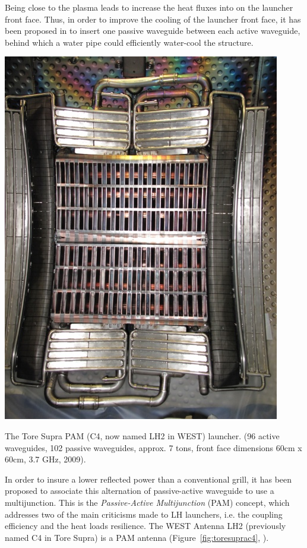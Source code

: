Being close to the plasma leads to increase the heat fluxes into on the launcher front face. Thus, in order to improve the cooling of the launcher front face, it has been proposed in  to insert one passive waveguide between each active waveguide, behind which a water pipe could efficiently water-cool the structure. 

\begin{marginfigure}
	\centering
	\includegraphics[width=0.9\linewidth]{figures/chap3/ToreSupra_C4}
	\caption{The Tore Supra PAM (C4, now named LH2 in WEST) launcher. (96 active waveguides, 102 passive waveguides, approx. 7 tons, front face dimensions 60cm x 60cm, 3.7 GHz, 2009).}
	\label{fig:toresuprac4}
\end{marginfigure}
In order to insure a lower reflected power than a conventional grill, it has been proposed to associate this alternation of passive-active waveguide to  use a multijunction. This is the \textit{Passive-Active Multijunction} (PAM) concept, which addresses two of the main criticisms made to LH launchers, i.e. the coupling efficiency and the heat loads resilience. The WEST Antenna LH2 (previously named C4 in Tore Supra) is a PAM antenna (Figure~\ref{fig:toresuprac4}, ). 


